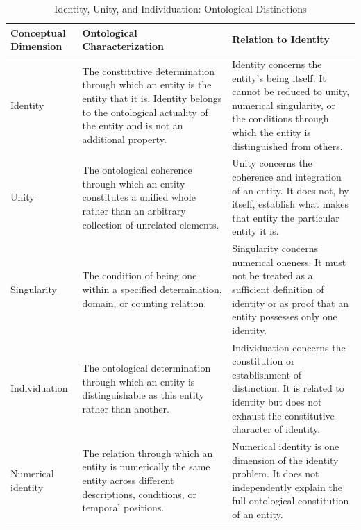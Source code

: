 
\begin{table}[htbp]
    \centering
    \caption{Identity, Unity, and Individuation: Ontological Distinctions}
    \label{tab:identity-unity-individuation}

    \renewcommand{\arraystretch}{1.4}
    \begin{tabular}{p{3.1cm} p{5.2cm} p{5.3cm}}
        \hline
        \textbf{Conceptual Dimension} &
        \textbf{Ontological Characterization} &
        \textbf{Relation to Identity} \\
        \hline

        Identity &
        The constitutive determination through which an entity is the entity that it is. Identity belongs to the ontological actuality of the entity and is not an additional property. &
        Identity concerns the entity's being itself. It cannot be reduced to unity, numerical singularity, or the conditions through which the entity is distinguished from others. \\

        Unity &
        The ontological coherence through which an entity constitutes a unified whole rather than an arbitrary collection of unrelated elements. &
        Unity concerns the coherence and integration of an entity. It does not, by itself, establish what makes that entity the particular entity it is. \\

        Singularity &
        The condition of being one within a specified determination, domain, or counting relation. &
        Singularity concerns numerical oneness. It must not be treated as a sufficient definition of identity or as proof that an entity possesses only one identity. \\

        Individuation &
        The ontological determination through which an entity is distinguishable as this entity rather than another. &
        Individuation concerns the constitution or establishment of distinction. It is related to identity but does not exhaust the constitutive character of identity. \\

        Numerical identity &
        The relation through which an entity is numerically the same entity across different descriptions, conditions, or temporal positions. &
        Numerical identity is one dimension of the identity problem. It does not independently explain the full ontological constitution of an entity. \\


\end{tabular}
\end{table}

